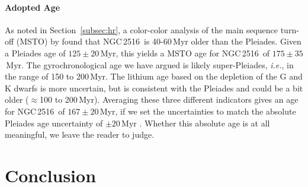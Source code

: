 \documentclass[12pt,twocolumn,tighten]{aastex63}
\newcommand{\cn}{NGC\,2516} %
\begin{document}
\paragraph{Adopted Age}
As noted in Section~\ref{subsec:hr}, a color-color analysis of the
main sequence turn-off (MSTO) by \citet{cummings_2018} found that \cn\
is 40-60\,Myr older than the Pleiades.  Given a Pleiades age of
$125\pm20$\,Myr, this yields a MSTO age for \cn\ of $175\pm35$\,Myr.
The gyrochronological age we have argued is likely super-Pleiades,
{\it i.e.}, in the range of 150 to 200\,Myr.  The lithium age based on
the depletion of the G and K dwarfs is more uncertain, but is
consistent with the Pleiades and could be a bit older ($\approx$100 to
200\,Myr).  Averaging these three different indicators gives an age
for \cn\ of $167\pm20$\,Myr, if we set the uncertainties to match the
absolute Pleiades age uncertainty of $\pm 20\,$Myr
\citep{soderblom_ages_2014}.  Whether this absolute age is at all
meaningful, we leave the reader to judge.



\section{Conclusion}
\label{sec:conclusion}
\end{document}
